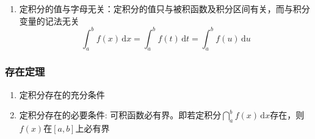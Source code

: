 \documentclass[../book.tex]{subfiles}
\begin{document}
\begin{enumerate}
        分点 $x_i$ 任取，一点 $\xi_i \in (x_{i-1}, x_i)$ 任取，
        故可做两个 {\color{red}{特取}}，
        即将 $[a,b]$ $n$ 等分且取每个小区间的右端点为 $\xi_i$，即
        \[
            \int_a^b f(x)\,\mathrm{d}x
            =
            \lim_{n \to \infty}
            \sum_{i=1}^{n}
            f\!\left(a + \frac{b-a}{n} i\right)
            \frac{b-a}{n}
        \]
        若将式子中的 $a,b$ 特殊化为 $0,1$ 这两个数，即
        \[
                {\color{red}{\bigstar\bigstar}}\int_0^1 f(x)\,\mathrm{d}x
            =
            \lim_{n \to \infty}
            \sum_{i=1}^{n}
            f\!\left(\frac{i}{n}\right)
            \frac{1}{n}
            =
            \lim_{n \to \infty}
            \sum_{i=1}^{n}
            f\!\left(\frac{2i - 1}{2n}\right)
            \frac{1}{n}, \quad\text{中点：}\frac{\displaystyle\frac{i - 1}{n} + \frac{i}{n}}{2}
        \]
        \item 定积分的值与字母无关：定积分的值只与被积函数及积分区间有关，而与积分变量的记法无关
        \[
            \int_a^b f(x)\,\mathrm{d}x = \int_a^b f(t)\,\mathrm{d}t = \int_a^b f(u)\,\mathrm{d}u
        \]
    \end{enumerate}

    \subsubsection{存在定理}

    \begin{enumerate}
        \item 定积分存在的充分条件
        \item 定积分存在的必要条件: 可积函数必有界。即若定积分$\dint_a^b f(x)\,\mathrm{d}x$存在，则$f(x)$在$[a, b]$上必有界
    \end{enumerate}
\end{document}
